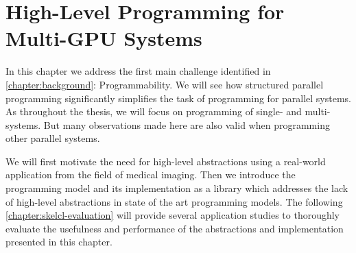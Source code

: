
\chapter{High-Level Programming for Multi-GPU Systems}

\label{chapter:skelcl}

In this chapter we address the first main challenge identified in \autoref{chapter:background}: Programmability.
We will see how structured parallel programming significantly simplifies the task of programming for parallel systems.
As throughout the thesis, we will focus on programming of single- and multi-\GPU systems.
But many observations made here are also valid when programming other parallel systems.

We will first motivate the need for high-level abstractions using a real-world \OpenCL application from the field of medical imaging.
Then we introduce the \emph{\SkelCL} programming model and its implementation as a \Cpp library which addresses the lack of high-level abstractions in state of the art \GPU programming models.
The following \autoref{chapter:skelcl-evaluation} will provide several application studies to thoroughly evaluate the usefulness and performance of the abstractions and implementation presented in this chapter.









